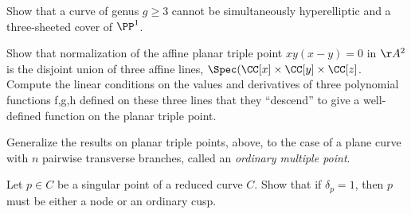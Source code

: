 \begin{exercise}\label{gonality exclusion}
Show that a curve of genus $g \geq 3$ cannot be simultaneously hyperelliptic and a three-sheeted cover of $\PP^1$.
\end{exercise}

\begin{exercise}\label{planar triple pt}
Show that normalization of the affine planar triple point $xy(x-y) = 0$ in $\AA^2$ is the disjoint union of three
affine lines, $\Spec(\CC[x] \times \CC[y]\times \CC[z]$. Compute the linear conditions on the values and derivatives of three polynomial functions f,g,h defined on
these three lines that they ``descend'' to give a well-defined function on the planar triple point.
\end{exercise}

\begin{exercise} Generalize the results on planar triple points, above, to the case of a plane curve with $n$ pairwise
transverse branches, called an \emph{ordinary multiple point}.
\end{exercise}

\begin{exercise}\label{delta=1 characterization}
Let $p \in C$ be a singular point of a reduced curve $C$. Show that if $\delta_p = 1$, then $p$ must be either a node or an ordinary cusp.
\end{exercise}



 